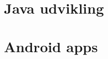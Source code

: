 

\newif\ifdraftmode
\draftmodetrue






	

	\tableofcontents


	\part{Java udvikling}

	\graphicspath{{sections/java/1/figures/}}
	

	\graphicspath{{sections/java/2/figures/}}
	
	
	\part{Android apps}
	
	\graphicspath{{sections/android/layouts/figures/}}
	
	
	


